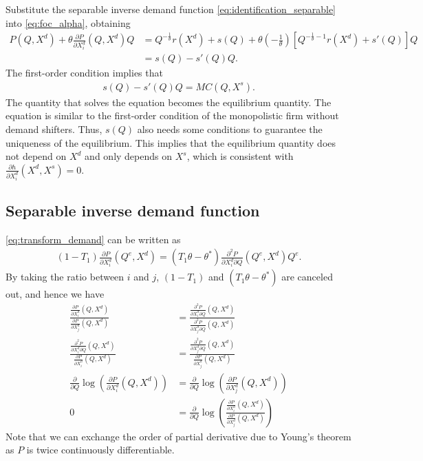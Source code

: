 \documentclass[11pt, a4paper]{article}
\theoremstyle{remark}
\begin{document}
Substitute the separable inverse demand function \eqref{eq:identification_separable} into \eqref{eq:foc_alpha}, obtaining
\begin{align}
    P(Q, X^{d}) + \theta \frac{\partial P}{\partial X_i^{d}} (Q, X^{d}) Q & =  Q^{-\frac{1}{\theta}} r(X^{d}) + s(Q) + \theta \left(-\frac{1}{\theta}\right) \left[  Q^{-\frac{1}{\theta} -1} r(X^{d}) + s'(Q)\right]Q\\
    & = s(Q) - s'(Q)Q.
\end{align}
The first-order condition implies that
\begin{align}
    s(Q) - s'(Q)Q = MC(Q, X^{s}).
\end{align}
The quantity that solves the equation becomes the equilibrium quantity.
The equation is similar to the first-order condition of the monopolistic firm without demand shifters.
Thus, $s(Q)$ also needs some conditions to guarantee the uniqueness of the equilibrium.
This implies that the equilibrium quantity does not depend on $X^{d}$ and only depends on $X^{s}$, which is consistent with $\frac{\partial h}{\partial X^{d}_{i}}(X^{d}, X^{s}) = 0$.


\subsection{Separable inverse demand function}

\eqref{eq:transform_demand} can be written as
\begin{align}
    (1 -  T_1)\frac{\partial P}{\partial X^{d}_{i}}(Q^e, X^{d}) = ( T_1\theta  - \theta^*)\frac{\partial^2 P}{\partial X^{d}_{i}\partial Q}(Q^e, X^{d})Q^e.
\end{align}
By taking the ratio between $i$ and $j$, $(1 - T_1)$ and  $(T_1\theta - \theta^{*})$ are canceled out, and hence we have
\begin{align}
    \frac{\frac{\partial P}{\partial X^{d}_{i}}(Q, X^{d})}{\frac{\partial P}{\partial X^{d}_{j}}(Q, X^{d})} & = \frac{ \frac{\partial^2 P}{\partial X^{d}_{i} \partial Q}(Q, X^{d})}{\frac{\partial^2 P}{\partial X^{d}_{j} \partial Q}(Q, X^{d})}\\
    \frac{\frac{\partial^2 P}{\partial X^{d}_{i} \partial Q}(Q, X^{d})}{\frac{\partial P}{\partial X^{d}_{i}}(Q, X^{d})}  & = \frac{\frac{\partial^2 P}{\partial X^{d}_{j} \partial Q}(Q, X^{d})}{\frac{\partial P}{\partial X^{d}_{j}}(Q, X^{d})}\\ 
    \frac{\partial }{\partial Q} \log\left( \frac{\partial P}{\partial X^{d}_{i}}(Q, X^{d})\right) &= \frac{\partial }{\partial Q} \log\left( \frac{\partial P}{\partial X^{d}_{j}}(Q, X^{d})\right)\\
    0& = \frac{\partial}{\partial Q}\log\left(\frac{\frac{\partial P}{\partial X^{d}_{i}}(Q, X^{d})}{\frac{\partial P}{\partial X^{d}_{j}}(Q, X^{d})}\right)
\end{align}
Note that we can exchange the order of partial derivative due to Young's theorem as $P$ is twice continuously differentiable.
\end{document}
